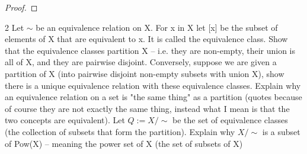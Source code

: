 \documentclass{article}
\begin{document}
\begin{proof}


\end{proof}

\begin{QU}{2}\label{Question 2}
	Let $\sim$ be an equivalence relation on X.  For x in X let [x] be the subset of elements of X that are equivalent to x. It is called the equivalence class. Show that the equivalence classes partition X -- i.e. they are non-empty, their union is all of X, and they are pairwise disjoint. Conversely, suppose we are given a partition of X (into pairwise disjoint non-empty subsets with union X), show there is a unique equivalence relation with these equivalence classes.  Explain why an equivalence relation on a set is "the same thing" as a partition (quotes because of course they are not exactly the same thing, instead what I mean is that the two concepts are equivalent). Let $Q := X/\sim$ be the set of equivalence classes (the collection of subsets that form the partition). Explain why $X/\sim$ is a subset of Pow(X) -- meaning the power set of X (the set of subsets of X)
\end{QU}
\end{document}

